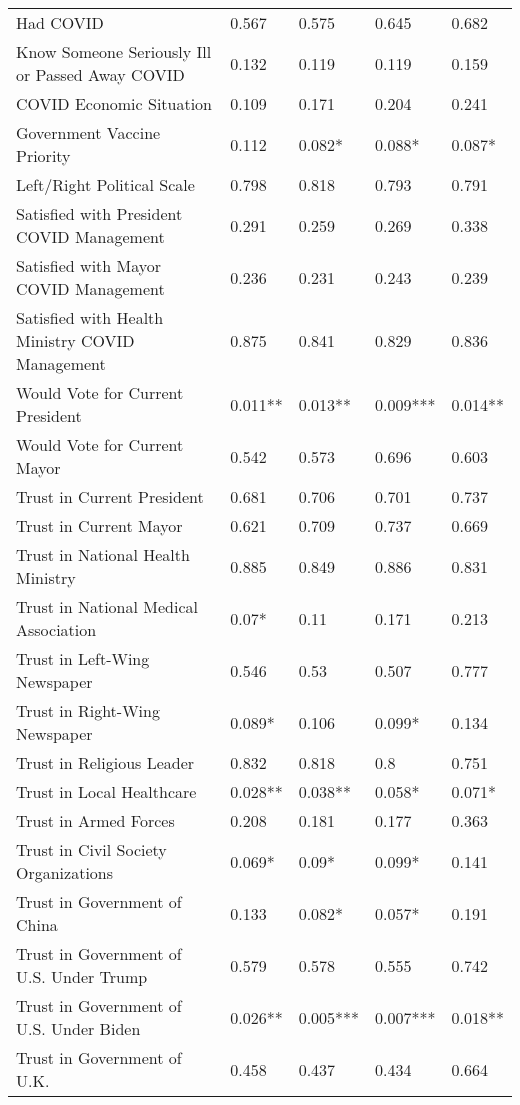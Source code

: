 \begin{table}[ht]
\begin{tabular}{lllll}
  Had COVID & 0.567 & 0.575 & 0.645 & 0.682 \\ 
  Know Someone Seriously Ill or Passed Away COVID & 0.132 & 0.119 & 0.119 & 0.159 \\ 
  COVID Economic Situation & 0.109 & 0.171 & 0.204 & 0.241 \\ 
  Government Vaccine Priority & 0.112 & 0.082* & 0.088* & 0.087* \\ 
  Left/Right Political Scale & 0.798 & 0.818 & 0.793 & 0.791 \\ 
  Satisfied with President COVID Management & 0.291 & 0.259 & 0.269 & 0.338 \\ 
  Satisfied with Mayor COVID Management & 0.236 & 0.231 & 0.243 & 0.239 \\ 
  Satisfied with Health Ministry COVID Management & 0.875 & 0.841 & 0.829 & 0.836 \\ 
  Would Vote for Current President & 0.011** & 0.013** & 0.009*** & 0.014** \\ 
  Would Vote for Current Mayor & 0.542 & 0.573 & 0.696 & 0.603 \\ 
  Trust in Current President & 0.681 & 0.706 & 0.701 & 0.737 \\ 
  Trust in Current Mayor & 0.621 & 0.709 & 0.737 & 0.669 \\ 
  Trust in National Health Ministry & 0.885 & 0.849 & 0.886 & 0.831 \\ 
  Trust in National Medical Association & 0.07* & 0.11 & 0.171 & 0.213 \\ 
  Trust in Left-Wing Newspaper & 0.546 & 0.53 & 0.507 & 0.777 \\ 
  Trust in Right-Wing Newspaper & 0.089* & 0.106 & 0.099* & 0.134 \\ 
  Trust in Religious Leader & 0.832 & 0.818 & 0.8 & 0.751 \\ 
  Trust in Local Healthcare & 0.028** & 0.038** & 0.058* & 0.071* \\ 
  Trust in Armed Forces & 0.208 & 0.181 & 0.177 & 0.363 \\ 
  Trust in Civil Society Organizations & 0.069* & 0.09* & 0.099* & 0.141 \\ 
  Trust in Government of China & 0.133 & 0.082* & 0.057* & 0.191 \\ 
  Trust in Government of U.S. Under Trump & 0.579 & 0.578 & 0.555 & 0.742 \\ 
  Trust in Government of U.S. Under Biden & 0.026** & 0.005*** & 0.007*** & 0.018** \\ 
  Trust in Government of U.K. & 0.458 & 0.437 & 0.434 & 0.664 \\ 

\end{tabular}
\end{table}
